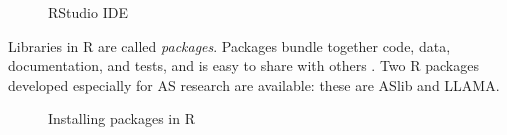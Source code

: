 \begin{figure}[H]
	\centering
	\caption{RStudio IDE} 
	\label{fig:rstudio}
\end{figure}

Libraries in R are called \textit{packages}. Packages bundle together code, data, documentation, and tests, and is easy to share with others \citep{wickham2015r}. Two R packages developed especially for AS research are available: these are ASlib and LLAMA.

\begin{figure}[H]
	\centering
	\caption{Installing packages in R} 
	\label{fig:installpackages}
\end{figure}

